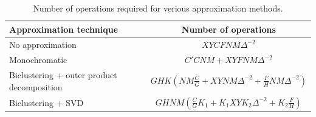 \begin{table}[t]
\tiny
\centering
\begin{tabular}{lc}
\hline
Approximation technique & Number of operations \\
\hline
No approximation & $X Y C F N M \Delta^{-2}$\\
Monochromatic & $C' C N M + X Y F N M \Delta^{-2}$\\
Biclustering + outer product decomposition & $G H K (N M \frac{C}{G} + X Y N M \Delta^{-2} + \frac{F}{H} N M \Delta^{-2})$ \\  
Biclustering + SVD & $G H N M (\frac{C}{G}K_1 + K_1 X Y K_2 \Delta^{-2} + K_2\frac{F}{H})$\\
\end{tabular}
\caption{Number of operations required for verious approximation methods.} 
\label{table:ops}
\end{table}

%
%
%





